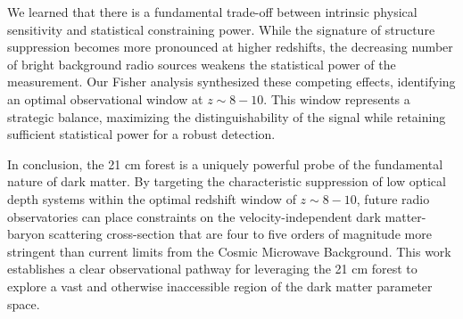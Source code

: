 \documentclass[]{article}
\begin{document}
We learned that there is a fundamental trade-off between intrinsic physical sensitivity and statistical constraining power. While the signature of structure suppression becomes more pronounced at higher redshifts, the decreasing number of bright background radio sources weakens the statistical power of the measurement. Our Fisher analysis synthesized these competing effects, identifying an optimal observational window at $z \sim 8-10$. This window represents a strategic balance, maximizing the distinguishability of the signal while retaining sufficient statistical power for a robust detection.

In conclusion, the 21 cm forest is a uniquely powerful probe of the fundamental nature of dark matter. By targeting the characteristic suppression of low optical depth systems within the optimal redshift window of $z \sim 8-10$, future radio observatories can place constraints on the velocity-independent dark matter-baryon scattering cross-section that are four to five orders of magnitude more stringent than current limits from the Cosmic Microwave Background. This work establishes a clear observational pathway for leveraging the 21 cm forest to explore a vast and otherwise inaccessible region of the dark matter parameter space.


{}

\end{document}
